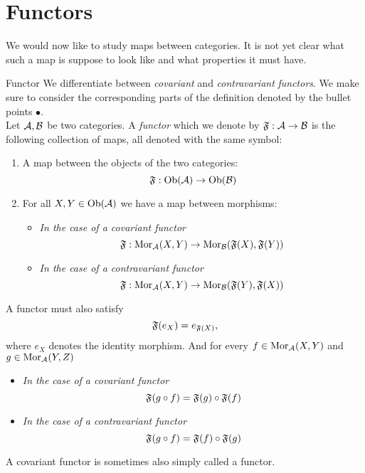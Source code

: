\section{Functors}
We would now like to study maps between categories. It is not yet clear what such a map is suppose to look like and what properties it must have.

\begin{definition}{Functor \cite[Section~1.3]{Roman2017}}{}
We differentiate between \emph{covariant} and \emph{contravariant} \emph{functors}. 
We make sure to consider the corresponding parts of the definition denoted by the bullet points $\bullet$.\\

Let $\mathcal{A}, \mathcal{B}$ be two categories. A \emph{functor} which we denote by $\mathfrak{F}: \mathcal{A} \to \mathcal{B}$ is the following collection of maps, all denoted with the same symbol:
\begin{enumerate}
    \item A map between the objects of the two categories:
    $$
    \mathfrak{F}: \mathrm {Ob}(\mathcal{A}) \to \mathrm {Ob}(\mathcal{B})
    $$
    \item For all $X,Y \in \mathrm {Ob}(\mathcal{A})$ we have a map between morphisms: 
    \begin{itemize}
        \item \emph{In the case of a covariant functor} $$\mathfrak{F}: \mathrm {Mor}_{\mathcal{A}}(X,Y) \to \mathrm {Mor}_{\mathcal{B}}(\mathfrak{F}(X), \mathfrak{F}(Y))$$
        \item \emph{In the case of a contravariant functor} $$\mathfrak{F}: \mathrm {Mor}_{\mathcal{A}}(X,Y) \to \mathrm {Mor}_{\mathcal{B}}(\mathfrak{F}(Y), \mathfrak{F}(X))$$
    \end{itemize}
\end{enumerate}
A functor must also satisfy
\begin{equation}
\label{eq:functor_functoriality_identity}
\mathfrak{F}(e_X) = e_{\mathfrak{F}(X)},
\end{equation}
where $e_X$ denotes the identity morphism. And for every $f \in \mathrm {Mor}_{\mathcal{A}}(X,Y)$ and $g \in \mathrm {Mor}_{\mathcal{A}}(Y,Z)$
\begin{itemize}
    \item \emph{In the case of a covariant functor}
    \begin{equation}
    \label{eq:functor_functoriality_covar}
    \mathfrak{F}(g \circ f) = \mathfrak{F}(g) \circ \mathfrak{F}(f)
    \end{equation}
    
    \item \emph{In the case of a contravariant functor}
    \begin{equation}
    \label{eq:functor_functoriality_contravar}
    \mathfrak{F}(g \circ f) = \mathfrak{F}(f) \circ \mathfrak{F}(g)
    \end{equation}
\end{itemize}
A covariant functor is sometimes also simply called a functor.
\end{definition}


